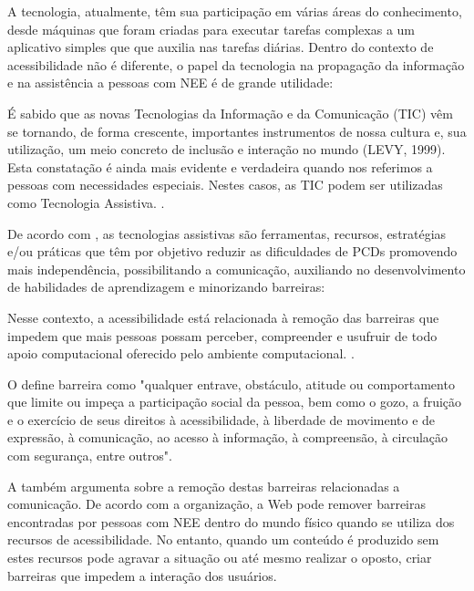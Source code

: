 A tecnologia, atualmente, têm sua participação em várias áreas do conhecimento, desde máquinas que foram criadas para executar tarefas complexas a um aplicativo simples que que auxilia nas tarefas diárias. Dentro do contexto de acessibilidade não é diferente, o papel da tecnologia na propagação da informação e na assistência a pessoas com NEE é de grande utilidade:
\begin{citacao}
    É sabido que as novas Tecnologias da Informação e da Comunicação (TIC) vêm se tornando, de forma crescente, importantes instrumentos de nossa cultura e, sua utilização, um meio concreto de inclusão e interação no mundo (LEVY, 1999).
    Esta constatação é ainda mais evidente e verdadeira quando nos referimos a pessoas com necessidades especiais. Nestes casos, as TIC podem ser utilizadas como Tecnologia Assistiva. \cite[p. 1]{congresso2002}.
\end{citacao}

De acordo com , as tecnologias assistivas são ferramentas, recursos, estratégias e/ou práticas que têm por objetivo reduzir as dificuldades de PCDs promovendo mais independência, possibilitando a comunicação, auxiliando no desenvolvimento de habilidades de aprendizagem e minorizando barreiras:

\begin{citacao}
    Nesse contexto, a acessibilidade está relacionada à remoção das barreiras que impedem que mais pessoas possam perceber, compreender e usufruir de todo apoio computacional oferecido pelo ambiente computacional. \cite[p. 18]{WIE3079}.
\end{citacao}

O \cite[art. 27]{lei2015} define barreira como "qualquer entrave, obstáculo, atitude ou comportamento que limite ou impeça a participação social da pessoa, bem como o gozo, a fruição e o exercício de seus direitos à acessibilidade, à liberdade de movimento e de expressão, à comunicação, ao acesso à informação, à compreensão, à circulação com segurança, entre outros".

A  também argumenta sobre a remoção destas barreiras relacionadas a comunicação. De acordo com a organização, a Web pode remover barreiras encontradas por pessoas com NEE dentro do mundo físico quando se utiliza dos recursos de acessibilidade. No entanto, quando um conteúdo é produzido sem estes recursos pode agravar a situação ou até mesmo realizar o oposto, criar barreiras que impedem a interação dos usuários.

